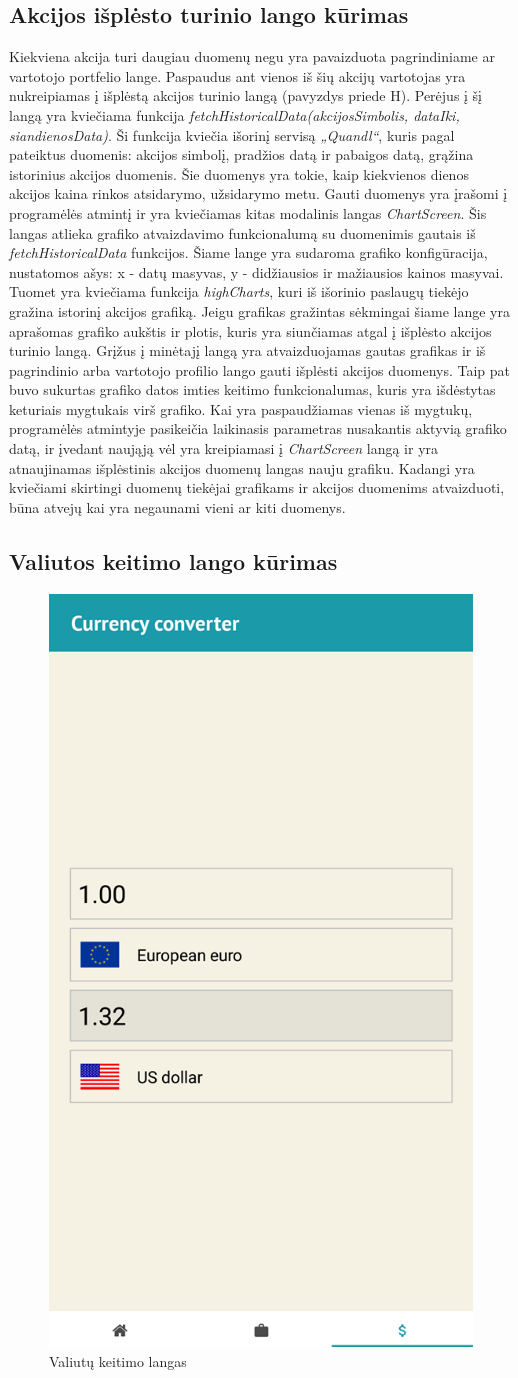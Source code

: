 \documentclass[a4paper,12pt,fleqn]{article}
\begin{document}
\subsection{Akcijos išplėsto turinio lango kūrimas}
Kiekviena akcija turi daugiau duomenų negu yra pavaizduota pagrindiniame ar vartotojo portfelio lange. Paspaudus ant vienos iš šių akcijų vartotojas yra nukreipiamas į išplėstą akcijos turinio langą (pavyzdys priede H). Perėjus į šį langą yra kviečiama funkcija \textit{fetchHistoricalData(akcijosSimbolis, dataIki, siandienosData)}. Ši funkcija kviečia išorinį servisą \textit{„Quandl“}, kuris pagal pateiktus duomenis: akcijos simbolį, pradžios datą ir pabaigos datą, grąžina istorinius akcijos duomenis. Šie duomenys yra tokie, kaip kiekvienos dienos akcijos kaina rinkos atsidarymo, užsidarymo metu. Gauti duomenys yra įrašomi į programėlės atmintį ir yra kviečiamas kitas modalinis langas \textit{ChartScreen}. Šis langas atlieka grafiko atvaizdavimo funkcionalumą su duomenimis gautais iš \textit{fetchHistoricalData} funkcijos. Šiame lange yra sudaroma grafiko konfigūracija, nustatomos ašys: x - datų masyvas, y - didžiausios ir mažiausios kainos masyvai. Tuomet yra kviečiama funkcija \textit{highCharts}, kuri iš išorinio paslaugų tiekėjo gražina istorinį akcijos grafiką. Jeigu grafikas gražintas sėkmingai šiame lange yra aprašomas grafiko aukštis ir plotis, kuris yra siunčiamas atgal į išplėsto akcijos turinio langą. Grįžus į minėtajį langą yra atvaizduojamas gautas grafikas ir iš pagrindinio arba vartotojo profilio lango gauti išplėsti akcijos duomenys. Taip pat buvo sukurtas grafiko datos imties keitimo funkcionalumas, kuris yra išdėstytas keturiais mygtukais virš grafiko. Kai yra paspaudžiamas vienas iš mygtukų, programėlės atmintyje pasikeičia laikinasis parametras nusakantis aktyvią grafiko datą, ir įvedant naująją vėl yra kreipiamasi į \textit{ChartScreen} langą ir yra atnaujinamas išplėstinis akcijos duomenų langas nauju grafiku. Kadangi yra kviečiami skirtingi duomenų tiekėjai grafikams ir akcijos duomenims atvaizduoti, būna atvejų kai yra negaunami vieni ar kiti duomenys.

\subsection{Valiutos keitimo lango kūrimas}

\begin{figure}[h]
	\centering
	\includegraphics[width=0.3\linewidth]{currency.png}
	\caption{Valiutų keitimo langas}
	\label{fig:currency}
\end{figure}
\end{document}
